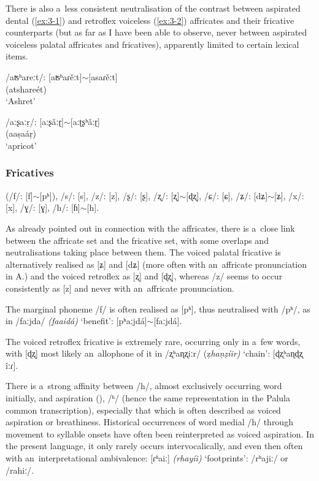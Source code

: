 There is also a~less consistent neutralisation of the contrast between aspirated dental (\ref{ex:3-1}) and retroflex voiceless (\ref{ex:3-2}) affricates and their fricative counterparts (but as far as I have been able to observe, never between aspirated voiceless palatal affricates and fricatives), apparently limited to certain lexical items. 

\begin{exe}
\ex
\label{ex:3-1}
\gll /aʦʰareːt/: [aʦʰaɾěːt]$\sim$[asaɾěːt] \\
(atshareét) \\
\glt `Ashret'

\ex
\label{ex:3-2}
\gll /aːʂaːṛ/: [aːʂǎːɽ]$\sim$[aːʈʂʰǎːɽ] \\
(aaṣaáṛ) \\
\glt `apricot'
\end{exe}

\subsubsection*{Fricatives}

(/f/: [f]$\sim$[pʰ]), /s/: [s], /z/: [z], /ʂ/: [ʂ], /ʐ/: [ʐ]$\sim$[ɖʐ], /ɕ/: [ɕ], /ʑ/: [dʑ]$\sim$[ʑ], /x/: [x], /ɣ/: [ɣ], /h/: [ɦ]$\sim$[h].


As already pointed out in connection with the affricates, there is a~close link between the affricate set and the fricative set, with some overlaps and neutralisations taking place between them. The voiced palatal fricative is alternatively realised as [ʑ] and [dʑ] (more often with an~affricate pronunciation in A.) and the voiced retroflex as [ʐ] and [ɖʐ], whereas /z/ seems to occur consistently as [z] and never with an~affricate pronunciation.


The marginal phoneme /f/ is often realised as [pʰ], thus neutralised with /pʰ/, as in /faːjda/ \textit{(faaidá)} `benefit': [pʰaːjdá]$\sim$[faːjdá].


The voiced retroflex fricative is extremely rare, occurring only in a~few words, with [ɖʐ] most likely an~allophone of it in /ʐʰaɳʐiːr/ (ẓ\textit{haṇẓíir)} `chain': [ɖʐʰaɳɖʐ îːɾ]. 


There is a~strong affinity between /h/, almost exclusively occurring word initially, and aspiration (), /ʰ/ (hence the same representation in the Palula common transcription), especially that which is often described as voiced aspiration or breathiness. Historical occurrences of word medial /h/ through movement to syllable onsets have often been reinterpreted as voiced aspiration. In the present language, it only rarely occurs intervocalically, and even then often with an~interpretational ambivalence: [ɾʱaiː] \textit{(rhayíi)} `footprints': /rʰajiː/ or /rahiː/.


